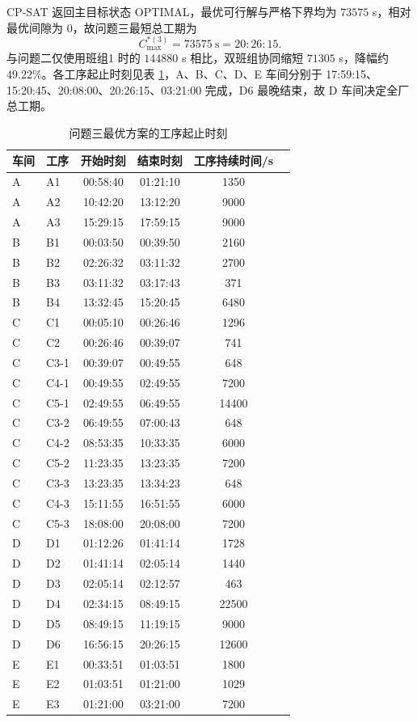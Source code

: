 \documentclass[12pt,a4paper]{article}
\begin{document}
CP-SAT 返回主目标状态 OPTIMAL，最优可行解与严格下界均为 $73575$ s，相对最优间隙为 0，故问题三最短总工期为
\begin{equation}
C_{\max}^{*(3)}=73575\ \text{s}=20:26:15 .
\end{equation}
与问题二仅使用班组1 时的 $144880$ s 相比，双班组协同缩短 $71305$ s，降幅约 $49.22\%$。各工序起止时刻见表 \ref{tab:p3schedule}，A、B、C、D、E 车间分别于 17:59:15、15:20:45、20:08:00、20:26:15、03:21:00 完成，D6 最晚结束，故 D 车间决定全厂总工期。

\begin{table}[H]
\centering
\caption{问题三最优方案的工序起止时刻}
\small
\label{tab:p3schedule}
\begin{tabular}{llcccc}
\toprule
车间 & 工序 & 开始时刻 & 结束时刻 & 工序持续时间/s \\
\midrule
A & A1 & 00:58:40 & 01:21:10 & 1350 \\
A & A2 & 10:42:20 & 13:12:20 & 9000 \\
A & A3 & 15:29:15 & 17:59:15 & 9000 \\
\midrule
B & B1 & 00:03:50 & 00:39:50 & 2160 \\
B & B2 & 02:26:32 & 03:11:32 & 2700 \\
B & B3 & 03:11:32 & 03:17:43 & 371 \\
B & B4 & 13:32:45 & 15:20:45 & 6480 \\
\midrule
C & C1 & 00:05:10 & 00:26:46 & 1296 \\
C & C2 & 00:26:46 & 00:39:07 & 741 \\
C & C3-1 & 00:39:07 & 00:49:55 & 648 \\
C & C4-1 & 00:49:55 & 02:49:55 & 7200 \\
C & C5-1 & 02:49:55 & 06:49:55 & 14400 \\
C & C3-2 & 06:49:55 & 07:00:43 & 648 \\
C & C4-2 & 08:53:35 & 10:33:35 & 6000 \\
C & C5-2 & 11:23:35 & 13:23:35 & 7200 \\
C & C3-3 & 13:23:35 & 13:34:23 & 648 \\
C & C4-3 & 15:11:55 & 16:51:55 & 6000 \\
C & C5-3 & 18:08:00 & 20:08:00 & 7200 \\
\midrule
D & D1 & 01:12:26 & 01:41:14 & 1728 \\
D & D2 & 01:41:14 & 02:05:14 & 1440 \\
D & D3 & 02:05:14 & 02:12:57 & 463 \\
D & D4 & 02:34:15 & 08:49:15 & 22500 \\
D & D5 & 08:49:15 & 11:19:15 & 9000 \\
D & D6 & 16:56:15 & 20:26:15 & 12600 \\
\midrule
E & E1 & 00:33:51 & 01:03:51 & 1800 \\
E & E2 & 01:03:51 & 01:21:00 & 1029 \\
E & E3 & 01:21:00 & 03:21:00 & 7200 \\
\bottomrule
\end{tabular}
\end{table}
\end{document}

